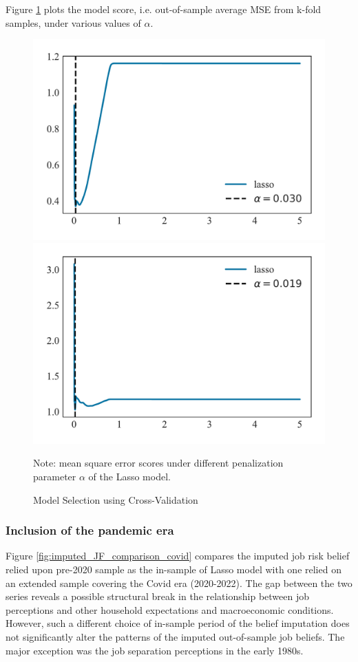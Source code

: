  Figure \ref{fig:impute_cv} plots the model score, i.e. out-of-sample average MSE from k-fold samples, under various values of $\alpha$. 

      \begin{figure}[ht]
    	\caption{Model Selection using Cross-Validation}
    	\label{fig:impute_cv}
    	\begin{center}
	\includegraphics[width=0.48\linewidth]{text/Chapter2/Figures/unbounded_imputing_job_finding_cv.pdf} 
\includegraphics[width=0.48\linewidth]{text/Chapter2/Figures/unbounded_imputing_job_separation_cv.pdf} 
    	\end{center}
    
    	\begin{flushleft}Note: mean square error scores under different penalization parameter $\alpha$ of the Lasso model.\end{flushleft}
    \end{figure}
    
\subsubsection{Inclusion of the pandemic era}
\label{appendix:sensitivity_imputation}

Figure \ref{fig:imputed_JF_comparison_covid} compares the imputed job risk belief relied upon pre-2020 sample as the in-sample of Lasso model with one relied on an extended sample covering the Covid era (2020-2022). The gap between the two series reveals a possible structural break in the relationship between job perceptions and other household expectations and macroeconomic conditions. However, such a different choice of in-sample period of the belief imputation does not significantly alter the patterns of the imputed out-of-sample job beliefs. The major exception was the job separation perceptions in the early 1980s.  

